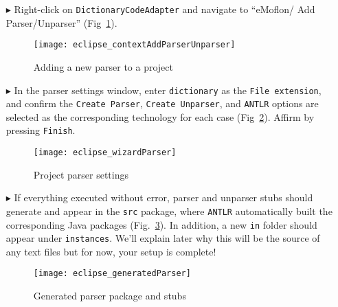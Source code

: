 \begin{itemize}

\item[$\blacktriangleright$] Right-click on \texttt{DictionaryCodeAdapter} and navigate to ``eMoflon/ Add Parser/Unparser''
(Fig~\ref{eclipse:contextParser}).

\vspace{0.5cm}

\begin{figure}[htpb]
\begin{center}
  \texttt{[image: eclipse\_contextAddParserUnparser]}
  \caption{Adding a new parser to a project}
  \label{eclipse:contextParser}
\end{center}
\end{figure}


\item[$\blacktriangleright$] In the parser settings window, enter \texttt{dictionary} as the \texttt{File extension}, and confirm the \texttt{Create Parser},
\texttt{Create Unparser}, and \texttt{ANTLR} options are selected as the corresponding technology for each case (Fig~\ref{eclipse:wizardParser}). Affirm by
pressing \texttt{Finish}.

\begin{figure}[htpb]
\begin{center}
  \texttt{[image: eclipse\_wizardParser]}
  \caption{Project parser settings}
  \label{eclipse:wizardParser}
\end{center}
\end{figure}

\vspace{0.5cm}

\item[$\blacktriangleright$] If everything executed without error, parser and unparser stubs should generate and appear in the \texttt{src}
package, where \texttt{ANTLR} automatically built the corresponding Java packages (Fig.~\ref{eclipse:generatedParser}). In addition, a new
\texttt{in} folder should appear under \texttt{instances}. We'll explain later why this will be the source of any text files but for now, your setup
is complete!

\begin{figure}[htpb]
\begin{center}
  \texttt{[image: eclipse\_generatedParser]}
  \caption{Generated parser package and stubs}
  \label{eclipse:generatedParser}
\end{center}
\end{figure}

\end{itemize}
